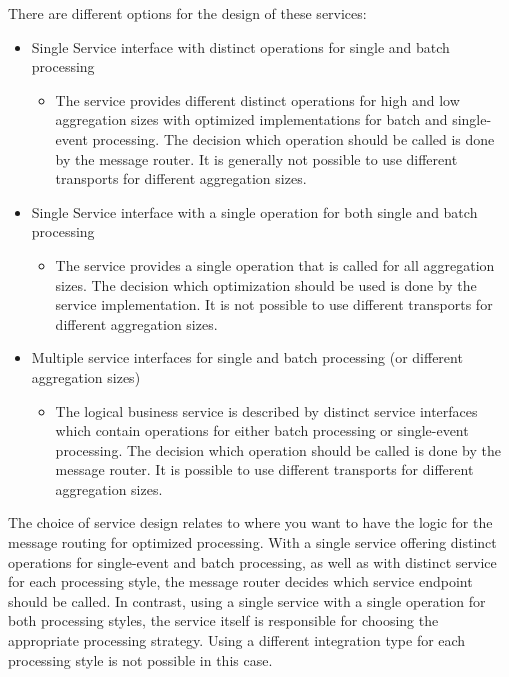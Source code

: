 There are different options for the design of these services:
\begin{itemize}
	\item Single Service interface with distinct operations for single and batch processing
	\begin{itemize}
		\item The service provides different distinct operations for high and low aggregation sizes with optimized implementations for batch and single-event processing. The decision which operation should be called is done by the message router. It is generally not possible to use different transports for different aggregation sizes.
	\end{itemize}
	\item Single Service interface with a single operation for both single and batch processing
	\begin{itemize}
		\item The service provides a single operation that is called for all aggregation sizes. The decision which optimization should be used is done by the service implementation. It is not possible to use different transports for different aggregation sizes.
	\end{itemize}
	\item Multiple service interfaces for single and batch processing (or different aggregation sizes)
	\begin{itemize}
		\item The logical business service is described by distinct service interfaces which contain operations for either batch processing or single-event processing. The decision which operation should be called is done by the message router. It is possible to use different transports for different aggregation sizes.
	\end{itemize}
\end{itemize}

The choice of service design relates to where you want to have the logic for the message routing for optimized processing. With a single service offering distinct operations for single-event and batch processing, as well as with distinct service for each processing style, the message router decides which service endpoint should be called. In contrast, using a single service with a single operation for both processing styles, the service itself is responsible for choosing the appropriate processing strategy. Using a different integration type for each processing style is not possible in this case.

